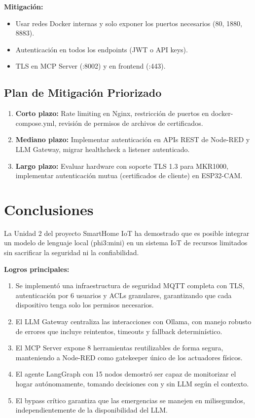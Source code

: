 \documentclass[12pt,letterpaper]{article}
\begin{document}
\textbf{Mitigación:}
\begin{itemize}
    \item Usar redes Docker internas y solo exponer los puertos necesarios (80, 1880, 8883).
    \item Autenticación en todos los endpoints (JWT o API keys).
    \item TLS en MCP Server (:8002) y en frontend (:443).
\end{itemize}

\subsection{Plan de Mitigación Priorizado}

\begin{enumerate}
    \item \textbf{Corto plazo:} Rate limiting en Nginx, restricción de puertos en docker-compose.yml, revisión de permisos de archivos de certificados.
    \item \textbf{Mediano plazo:} Implementar autenticación en APIs REST de Node-RED y LLM Gateway, migrar healthcheck a listener autenticado.
    \item \textbf{Largo plazo:} Evaluar hardware con soporte TLS 1.3 para MKR1000, implementar autenticación mutua (certificados de cliente) en ESP32-CAM.
\end{enumerate}

\newpage

\section{Conclusiones}

La Unidad 2 del proyecto SmartHome IoT ha demostrado que es posible integrar un modelo de lenguaje local (phi3:mini) en un sistema IoT de recursos limitados sin sacrificar la seguridad ni la confiabilidad.

\textbf{Logros principales:}

\begin{enumerate}
    \item Se implementó una infraestructura de seguridad MQTT completa con TLS, autenticación por 6 usuarios y ACLs granulares, garantizando que cada dispositivo tenga solo los permisos necesarios.
    \item El LLM Gateway centraliza las interacciones con Ollama, con manejo robusto de errores que incluye reintentos, timeouts y fallback determinístico.
    \item El MCP Server expone 8 herramientas reutilizables de forma segura, manteniendo a Node-RED como gatekeeper único de los actuadores físicos.
    \item El agente LangGraph con 15 nodos demostró ser capaz de monitorizar el hogar autónomamente, tomando decisiones con y sin LLM según el contexto.
    \item El bypass crítico garantiza que las emergencias se manejen en milisegundos, independientemente de la disponibilidad del LLM.
\end{enumerate}
\end{document}

